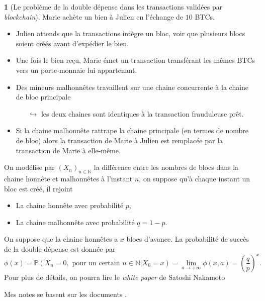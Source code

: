 \documentclass[8pt,notheorems]{beamer}
\def \N{\mathbb N}
\theoremstyle{definition}
\theoremstyle{example}
\newtheorem{example}{\translate{Exemple}}
\theoremstyle{mystyle}
\theoremstyle{plain}
\begin{document}
\begin{frame}[allowframebreaks]
\begin{example}[Le problème de la double dépense dans les transactions validées par \textit{blockchain}]
Marie achète un bien à Julien en l'échange de $10$ BTCs.
\begin{itemize}
\item Julien attends que la transactions intègre un bloc, voir que plusieurs blocs soient créés avant d'expédier le bien.
\item Une fois le bien reçu, Marie émet un transaction transférant les mêmes BTCs vers un porte-monnaie lui appartenant.
\item Des mineurs malhonnêtes travaillent sur une chaine concurrente à la chaine de bloc principale
\begin{itemize}
\item[$\hookrightarrow$] les deux chaines sont identiques à la transaction frauduleuse prêt.
\end{itemize}
\item Si la chaine malhonnête rattrape la chaine principale (en termes de nombre de bloc) alors la transaction de Marie à Julien est remplacée par la transaction de Marie à elle-même.
\end{itemize}
\end{example}
On modélise par $(X_n)_{n\in\N}$ la différence entre les nombres de blocs dans la chaine honnête et malhonnêtes à l'instant $n$, on suppose qu'à chaque instant un bloc est créé, il rejoint
\begin{itemize}
\item La chaine honnête avec probabilité $p$,
\item La chaine malhonnête avec probabilité $q=1-p$.
\end{itemize}
On suppose que la chaine honnêtes a $x$ blocs d'avance. La probabilité de succès de la double dépense est donnée par
$$
\phi(x)=\mathbb{P}\left(X_n=0,\text{ pour un certain }n\in\N|X_0=x\right)=\underset{a\rightarrow+\infty}{\lim}\phi(x,a)=\left(\frac{q}{p}\right)^{x}.
$$
Pour plus de détails, on pourra lire le \textit{white paper} de Satoshi Nakamoto \cite{nakamoto2008bitcoin}


\end{frame}
\begin{frame}
Mes notes se basent sur les documents \cite{TruquetEnsai,Nabil17,Hohn,le2006integration,williams1991probability}.


\end{frame}
\end{document}
